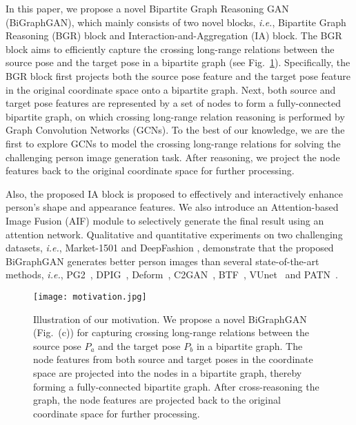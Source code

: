 \documentclass{bmvc2k}
\begin{document}
In this paper, we propose a novel Bipartite Graph Reasoning GAN (BiGraphGAN), which mainly consists of two novel blocks, \emph{i.e.}, Bipartite Graph Reasoning (BGR) block and Interaction-and-Aggregation (IA) block.
The BGR block aims to efficiently capture the crossing long-range relations between the source pose and the target pose in a bipartite graph (see Fig.~\ref{fig:motivation}). 
Specifically, the BGR block first projects both the source pose feature and the target pose feature in the original coordinate space onto a bipartite graph.
Next, both source and target pose features are represented by a set of nodes to form a fully-connected bipartite graph, on which crossing long-range relation reasoning is performed by Graph Convolution Networks (GCNs). 
To the best of our knowledge, we are the first to explore GCNs to model the crossing long-range relations for solving the challenging person image generation task.
After reasoning, we project the node features back to the original coordinate space for further processing. 

Also, the proposed IA block is proposed to effectively and interactively enhance person's shape and appearance features.
We also introduce an Attention-based Image Fusion (AIF) module to selectively generate the final result using an attention network.
Qualitative and quantitative experiments on two challenging datasets, \emph{i.e.}, Market-1501 \cite{zheng2015scalable} and DeepFashion \cite{liu2016deepfashion}, demonstrate that the proposed BiGraphGAN generates better person images than several state-of-the-art methods, \emph{i.e.}, PG2~\cite{ma2017pose}, DPIG~\cite{ma2018disentangled}, Deform~\cite{siarohin2018deformable}, C2GAN~\cite{tang2019cycle}, BTF~\cite{albahar2019guided}, VUnet~\cite{esser2018variational} and PATN~\cite{zhu2019progressive}.

\begin{figure}[!t]
	\centering
	\texttt{[image: motivation.jpg]}
	\caption{Illustration of our motivation. We propose a novel BiGraphGAN (Fig.~(c)) for capturing crossing long-range relations between the source pose $P_a$ and the target pose $P_b$ in a bipartite graph. The node features from both source and target poses in the coordinate space are projected into the nodes in a bipartite graph, thereby forming a fully-connected bipartite graph. After cross-reasoning the graph, the node features are projected back to the original coordinate space for further processing.}
	\label{fig:motivation}
\end{figure}
\end{document}
